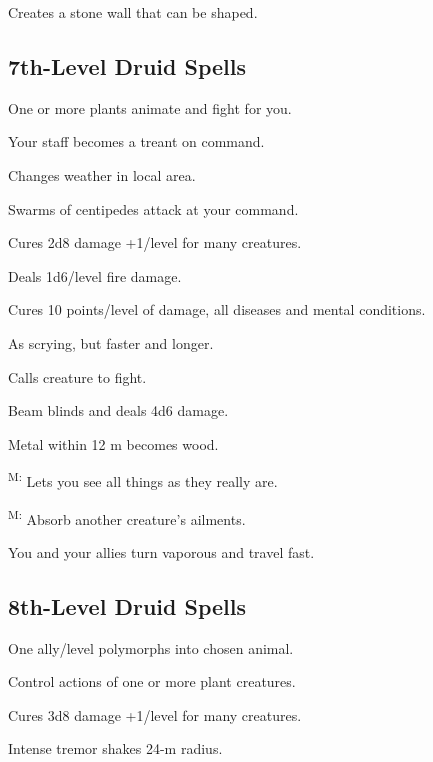  Creates a stone wall that can be shaped.



\subsection{7th-Level Druid Spells}

 One or more plants animate and fight for you.

 Your staff becomes a treant on command.

 Changes weather in local area.

 Swarms of centipedes attack at your command.

 Cures 2d8 damage +1/level for many creatures.

 Deals 1d6/level fire damage.

 Cures 10 points/level of damage, all diseases and mental conditions.

 As scrying, but faster and longer.

 Calls creature to fight.

 Beam blinds and deals 4d6 damage.

 Metal within 12 m becomes wood.

\textsuperscript{M:} Lets you see all things as they really are.

\textsuperscript{M:} Absorb another creature's ailments.

 You and your allies turn vaporous and travel fast.



\subsection{8th-Level Druid Spells}

 One ally/level polymorphs into chosen animal.

 Control actions of one or more plant creatures.

 Cures 3d8 damage +1/level for many creatures.

 Intense tremor shakes 24-m radius.

